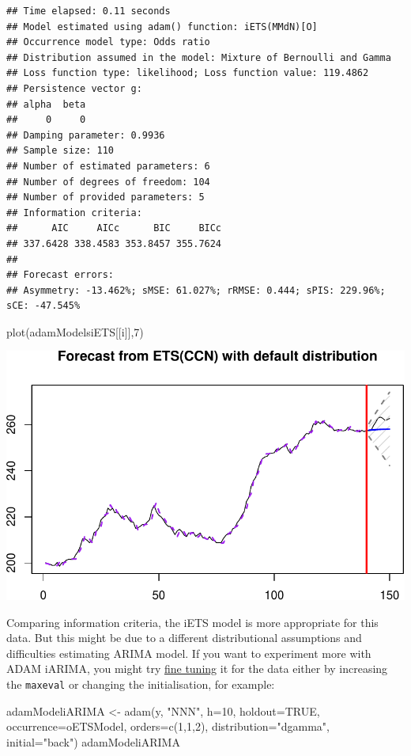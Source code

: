 \documentclass[
]{book}
\newenvironment{Shaded}{\begin{snugshade}}{\end{snugshade}}
\newcommand{\AttributeTok}[1]{\textcolor[rgb]{0.77,0.63,0.00}{#1}}
\newcommand{\ConstantTok}[1]{\textcolor[rgb]{0.00,0.00,0.00}{#1}}
\newcommand{\DecValTok}[1]{\textcolor[rgb]{0.00,0.00,0.81}{#1}}
\newcommand{\FunctionTok}[1]{\textcolor[rgb]{0.00,0.00,0.00}{#1}}
\newcommand{\NormalTok}[1]{#1}
\newcommand{\OtherTok}[1]{\textcolor[rgb]{0.56,0.35,0.01}{#1}}
\newcommand{\StringTok}[1]{\textcolor[rgb]{0.31,0.60,0.02}{#1}}
\theoremstyle{definition}
\theoremstyle{definition}
\theoremstyle{definition}
\theoremstyle{definition}
\theoremstyle{remark}
\begin{document}
\begin{verbatim}
## Time elapsed: 0.11 seconds
## Model estimated using adam() function: iETS(MMdN)[O]
## Occurrence model type: Odds ratio
## Distribution assumed in the model: Mixture of Bernoulli and Gamma
## Loss function type: likelihood; Loss function value: 119.4862
## Persistence vector g:
## alpha  beta 
##     0     0 
## Damping parameter: 0.9936
## Sample size: 110
## Number of estimated parameters: 6
## Number of degrees of freedom: 104
## Number of provided parameters: 5
## Information criteria:
##      AIC     AICc      BIC     BICc 
## 337.6428 338.4583 353.8457 355.7624 
## 
## Forecast errors:
## Asymmetry: -13.462%; sMSE: 61.027%; rRMSE: 0.444; sPIS: 229.96%; sCE: -47.545%
\end{verbatim}

\begin{Shaded}
\begin{Highlighting}[]
\FunctionTok{plot}\NormalTok{(adamModelsiETS[[i]],}\DecValTok{7}\NormalTok{)}
\end{Highlighting}
\end{Shaded}

\includegraphics{adam_files/figure-latex/unnamed-chunk-126-1.pdf}

Comparing information criteria, the iETS model is more appropriate for this data. But this might be due to a different distributional assumptions and difficulties estimating ARIMA model. If you want to experiment more with ADAM iARIMA, you might try \protect\hyperlink{ADAMInitialisationOptAndBack}{fine tuning} it for the data either by increasing the \texttt{maxeval} or changing the initialisation, for example:

\begin{Shaded}
\begin{Highlighting}[]
\NormalTok{adamModeliARIMA }\OtherTok{\textless{}{-}} \FunctionTok{adam}\NormalTok{(y, }\StringTok{"NNN"}\NormalTok{, }\AttributeTok{h=}\DecValTok{10}\NormalTok{, }\AttributeTok{holdout=}\ConstantTok{TRUE}\NormalTok{,}
                        \AttributeTok{occurrence=}\NormalTok{oETSModel, }\AttributeTok{orders=}\FunctionTok{c}\NormalTok{(}\DecValTok{1}\NormalTok{,}\DecValTok{1}\NormalTok{,}\DecValTok{2}\NormalTok{),}
                        \AttributeTok{distribution=}\StringTok{"dgamma"}\NormalTok{, }\AttributeTok{initial=}\StringTok{"back"}\NormalTok{)}
\NormalTok{adamModeliARIMA}
\end{Highlighting}
\end{Shaded}
\end{document}
